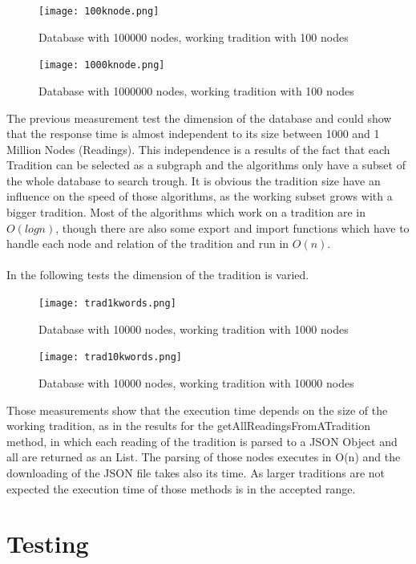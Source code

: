 \documentclass[11pt,fleqn,openany]{book} %
\begin{document}
\begin{figure}[h!]
  \caption{Database with 100000 nodes,  working tradition with 100 nodes }
  \centering
    \texttt{[image: 100knode.png]}
\end{figure}

\begin{figure}[h!]
  \caption{Database with 1000000 nodes,  working tradition with 100 nodes }
  \centering
    \texttt{[image: 1000knode.png]}
\end{figure}
The previous measurement test the dimension of the database and could show that the response time is almost independent to its size between 1000 and 1 Million Nodes (Readings). This independence is a results of the fact that each Tradition can be selected as a subgraph and the algorithms only have a subset of the whole database to search trough. It is obvious the tradition size have an influence on the speed of those algorithms, as the working subset grows with a bigger tradition. Most of the algorithms which work on a tradition are in $O(log n)$, though there are also some export and import functions which have to handle each node and relation of the tradition and run in $O(n)$. 
\\ \quad \\
In the following tests the dimension of the tradition is varied. 
\begin{figure}[h!]
  \caption{Database with 10000 nodes,  working tradition with 1000 nodes }
  \centering
    \texttt{[image: trad1kwords.png]}
\end{figure}
\begin{figure}[h!]
  \caption{Database with 10000 nodes,  working tradition with 10000 nodes }
  \centering
    \texttt{[image: trad10kwords.png]}
\end{figure}
Those measurements show that the execution time depends on the size of the working tradition, as in the results for the getAllReadingsFromATradition method, in which each reading of the tradition is parsed to a JSON Object and all are returned as an List. The parsing of those nodes executes in O(n) and the downloading of the JSON file takes also its time. As larger traditions are not expected the execution time of those methods is in the accepted range.


\part{Testing}
\end{document}
